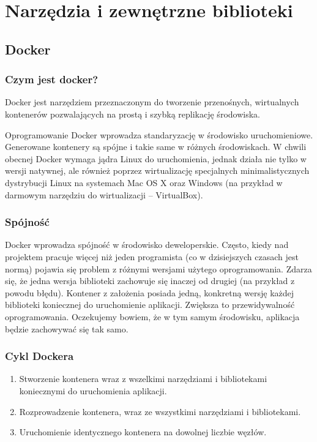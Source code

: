 \chapter{Narzędzia i zewnętrzne biblioteki}

\section{Docker}

\subsection[Czym jest docker?]{Czym jest docker?}
\par{Docker jest narzędziem przeznaczonym do tworzenie przenośnych, wirtualnych kontenerów pozwalających na prostą i szybką replikację środowiska.}

\par{Oprogramowanie Docker wprowadza standaryzację w środowisko uruchomieniowe. Generowane kontenery są spójne i takie same w różnych środowiskach. W chwili obecnej Docker wymaga jądra Linux do uruchomienia, jednak działa nie tylko w wersji natywnej, ale również poprzez wirtualizację specjalnych minimalistycznych dystrybucji Linux na systemach Mac OS X oraz Windows (na przykład w darmowym narzędziu do wirtualizacji – VirtualBox).}

\subsection[Spójność]{Spójność}

\par{Docker wprowadza spójność w środowisko deweloperskie. Często, kiedy nad projektem pracuje więcej niż jeden programista (co w dzisiejszych czasach jest normą) pojawia się problem z różnymi wersjami użytego oprogramowania. Zdarza się, że jedna wersja biblioteki zachowuje się inaczej od drugiej (na przykład z powodu błędu). Kontener z założenia posiada jedną, konkretną wersję każdej biblioteki koniecznej do uruchomienie aplikacji. Zwiększa to przewidywalność oprogramowania. Oczekujemy bowiem, że w tym samym środowisku, aplikacja będzie zachowywać się tak samo. }

\subsection[Cykl Dockera]{Cykl Dockera}


\begin{enumerate}
\item Stworzenie kontenera wraz z wszelkimi narzędziami i bibliotekami koniecznymi do uruchomienia aplikacji. 
\item Rozprowadzenie kontenera, wraz ze wszystkimi narzędziami i bibliotekami. 
\item Uruchomienie identycznego kontenera na dowolnej liczbie węzłów. 
\end{enumerate}

